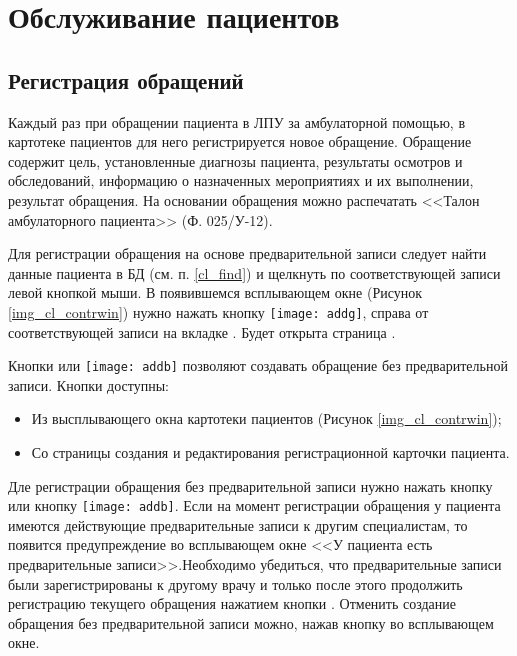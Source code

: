 \newpage
\section{Обслуживание пациентов}

\subsection {Регистрация обращений} \label{pol_obr}

Каждый раз при обращении пациента в ЛПУ за амбулаторной помощью, в картотеке пациентов для него регистрируется новое обращение. Обращение содержит цель, установленные диагнозы пациента, результаты осмотров и обследований, информацию о назначенных мероприятиях и их выполнении, результат обращения. На основании обращения можно распечатать <<Талон амбулаторного пациента>> (Ф. 025\slash У-12).

Для регистрации обращения на основе предварительной записи следует найти данные пациента в БД (см. п. \ref{cl_find}) и щелкнуть по соответствующей записи левой кнопкой мыши. В появившемся всплывающем окне (Рисунок \ref{img_cl_contrwin}) нужно нажать кнопку \texttt{[image: addg]}, справа от соответствующей записи на вкладке . Будет открыта страница .

Кнопки  или \texttt{[image: addb]} позволяют создавать обращение без предварительной записи. Кнопки доступны:
\begin{itemize}
 \item Из высплывающего окна картотеки пациентов (Рисунок \ref{img_cl_contrwin});
 \item Со страницы создания и редактирования регистрационной карточки пациента. 
\end{itemize}

Дле регистрации обращения без предварительной записи нужно нажать кнопку  или кнопку \texttt{[image: addb]}. Если на момент регистрации обращения у пациента имеются действующие предварительные записи к другим специалистам, то появится предупреждение во всплывающем окне <<У пациента есть предварительные записи>>.Необходимо убедиться, что предварительные записи были зарегистрированы к другому врачу и только после этого продолжить регистрацию текущего обращения нажатием кнопки . Отменить создание обращения без предварительной записи можно, нажав кнопку   во всплывающем окне.


